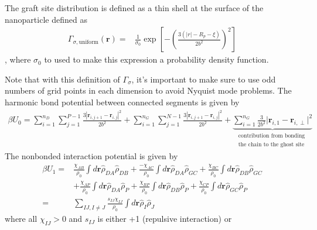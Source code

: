 \documentclass{article}
\begin{document}
The graft site distribution is defined as a thin shell at the surface of the
  nanoparticle defined as
\begin{align}
  \Gamma_{\sigma,\text{uniform}}  (\mathbf{r}) =& 
  \frac{1}{\sigma_0} \exp 
  \left[ -
     \left(
      \frac{3(\vert r \vert - R_p - \xi) }
        {2b^2}
    \right)^2
  \right]
\end{align},
where $\sigma_0 $ to used to make this expression a probability density function. 

Note that with this definition of $\Gamma_\sigma$, it's important to make sure
  to use odd numbers of grid points in each dimension to avoid Nyquist mode
  problems.
The harmonic bond potential between connected segments is given by
\begin{align*}
  \beta U_0 =
    \sum_{i=1}^{n_D} \sum_{j=1}^{P-1}
    \frac{3 \left| \mathbf{r}_{i,j+1} - \mathbf{r}_{i,j} \right| ^ 2 }
         { 2 b^2 }
    +
    \sum_{i=1}^{n_G} \sum_{j=1}^{N-1}
    \frac{3 \left| \mathbf{r}_{i,j+1} - \mathbf{r}_{i,j} \right| ^ 2 }
         { 2 b^2 }
    +
    \underbrace{\sum_{i=1}^{n_G}  \frac{3}{2b^2} 
    \vert \mathbf{r}_{i,1} - \mathbf{r}_{i,\perp} \vert^2}_
    {\substack{\text{contribution from bonding } \\
    \text{the chain  to the ghost site }}}
\end{align*}
The nonbonded interaction potential is given by
\begin{align*}
  \beta U_1 =&
    \frac{\chi_{AB}}{\rho_0} \int d\mathbf{r} \hat{\rho}_{DA} \hat{\rho}_{DB}
    + \frac{-\chi_{AC}}{\rho_0} \int d\mathbf{r} \hat{\rho}_{DA} \hat{\rho}_{GC}
    + \frac{\chi_{BC}}{\rho_0} \int d\mathbf{r} \hat{\rho}_{DB} \hat{\rho}_{GC}
    \\
    &+ \frac{\chi_{AP}}{\rho_0} \int d\mathbf{r} \hat{\rho}_{DA} \hat{\rho}_P
    + \frac{\chi_{BP}}{\rho_0} \int d\mathbf{r} \hat{\rho}_{DB} \hat{\rho}_P
    + \frac{\chi_{CP}}{\rho_0} \int d\mathbf{r} \hat{\rho}_{GC} \hat{\rho}_P \\
  =&
    \sum_{IJ, I \ne J} \frac{s_{IJ}\chi_{IJ}}{\rho_0}
    \int d \mathbf{r} \hat{\rho}_I \hat{\rho}_J
\end{align*}
where all $\chi_{IJ} > 0$ and $s_{IJ}$ is either +1 (repulsive interaction) or
\end{document}
